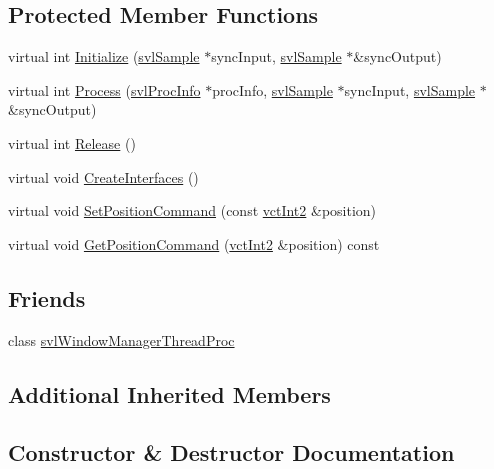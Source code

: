 \subsection*{Protected Member Functions}
\begin{DoxyCompactItemize}
\item 
virtual int \hyperlink{classsvl_filter_image_window_qt_stereo_af3a3a3bd31562988f7bb953a72531ca6}{Initialize} (\hyperlink{classsvl_sample}{svl\+Sample} $\ast$sync\+Input, \hyperlink{classsvl_sample}{svl\+Sample} $\ast$\&sync\+Output)
\item 
virtual int \hyperlink{classsvl_filter_image_window_qt_stereo_a93782fedb52934246f2bb28c7defb227}{Process} (\hyperlink{structsvl_proc_info}{svl\+Proc\+Info} $\ast$proc\+Info, \hyperlink{classsvl_sample}{svl\+Sample} $\ast$sync\+Input, \hyperlink{classsvl_sample}{svl\+Sample} $\ast$\&sync\+Output)
\item 
virtual int \hyperlink{classsvl_filter_image_window_qt_stereo_a18fe9065ef80165c03fd85910e576e4a}{Release} ()
\item 
virtual void \hyperlink{classsvl_filter_image_window_qt_stereo_a528723af991d95927d78432f6f1c1e56}{Create\+Interfaces} ()
\item 
virtual void \hyperlink{classsvl_filter_image_window_qt_stereo_ab8fe8f26e577b0f4604c9516cf2c0c12}{Set\+Position\+Command} (const \hyperlink{vct_fixed_size_vector_types_8h_add8c88eb6a432b15f14b866b9c35325f}{vct\+Int2} \&position)
\item 
virtual void \hyperlink{classsvl_filter_image_window_qt_stereo_ab1d89794b7070202b92d407c9f6a183b}{Get\+Position\+Command} (\hyperlink{vct_fixed_size_vector_types_8h_add8c88eb6a432b15f14b866b9c35325f}{vct\+Int2} \&position) const 
\end{DoxyCompactItemize}
\subsection*{Friends}
\begin{DoxyCompactItemize}
\item 
class \hyperlink{classsvl_filter_image_window_qt_stereo_a3da031c59e20922361dc2f6421a036db}{svl\+Window\+Manager\+Thread\+Proc}
\end{DoxyCompactItemize}
\subsection*{Additional Inherited Members}


\subsection{Constructor \& Destructor Documentation}
\hypertarget{classsvl_filter_image_window_qt_stereo_a1c3219fea5832e341ea8c7123519ed93}{}
